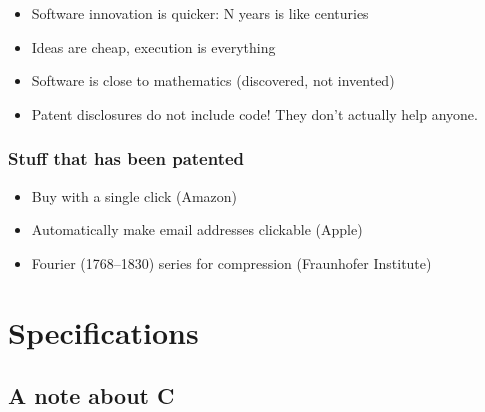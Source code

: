 \documentclass[12pt]{article}
\begin{document}
\begin{itemize}
  \item Software innovation is quicker: N years is like centuries
  \item Ideas are cheap, execution is everything
  \item Software is close to mathematics (discovered, not invented)
  \item Patent disclosures do not include code! They don't actually help anyone.
\end{itemize}

\subsubsection{Stuff that has been patented}

\begin{itemize}
    \item Buy with a single click (Amazon)
    \item Automatically make email addresses clickable (Apple)
    \item Fourier (1768--1830) series for compression (Fraunhofer Institute)
\end{itemize}






















\newpage
\section{Specifications}
\subsection{A note about C}
\end{document}
